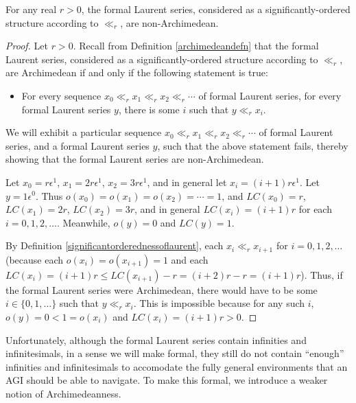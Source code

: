 \documentclass[twoside,11pt]{article}
\begin{document}
\begin{lemma}
For any real $r>0$, the formal Laurent series, considered as a significantly-ordered
structure according to $\ll_r$, are non-Archimedean.
\end{lemma}

\begin{proof}
    Let $r>0$.
    Recall from Definition \ref{archimedeandefn} that the formal Laurent series,
    considered as a significantly-ordered structure according to $\ll_r$, are
    Archimedean if and only if the following statement is true:
    \begin{itemize}
    \item
        For every sequence $x_0\ll_r x_1\ll_r x_2 \ll_r \cdots$ of formal Laurent series,
        for every formal Laurent series $y$, there is some $i$ such that
        $y\ll_r x_i$.
    \end{itemize}
    We will exhibit a particular sequence $x_0\ll_r x_1\ll_r x_2\ll_r\cdots$
    of formal Laurent series, and a formal Laurent series $y$, such that the
    above statement fails, thereby showing that the formal Laurent series
    are non-Archimedean.

    Let $x_0=r\epsilon^1$, $x_1=2r\epsilon^1$, $x_2=3r\epsilon^1$, and in general let
    $x_i=(i+1)r\epsilon^1$. Let $y=1\epsilon^0$.
    Thus $o(x_0)=o(x_1)=o(x_2)=\cdots=1$,
    and $LC(x_0)=r$, $LC(x_1)=2r$, $LC(x_2)=3r$, and in general $LC(x_i)=(i+1)r$
    for each $i=0,1,2,\ldots$. Meanwhile, $o(y)=0$ and $LC(y)=1$.

    By Definition \ref{significantorderednessoflaurent},
    each $x_i\ll_r x_{i+1}$ for $i=0,1,2,\ldots$ (because each $o(x_i)=o(x_{i+1})=1$
    and each $LC(x_i)=(i+1)r\leq LC(x_{i+1})-r=(i+2)r-r=(i+1)r$).
    Thus, if the formal Laurent series were Archimedean, there would have to be some
    $i\in\{0,1,\ldots\}$
    such that $y\ll_r x_i$. This is impossible because
    for any such $i$, $o(y)=0<1=o(x_i)$ and $LC(x_i)=(i+1)r>0$.
\end{proof}

Unfortunately, although the formal Laurent series contain infinities and infinitesimals,
in a sense we will make formal, they still do not contain ``enough'' infinities and
infinitesimals to accomodate the fully general environments that an AGI should be able
to navigate. To make this formal, we introduce a weaker
notion of Archimedeanness.
\end{document}
